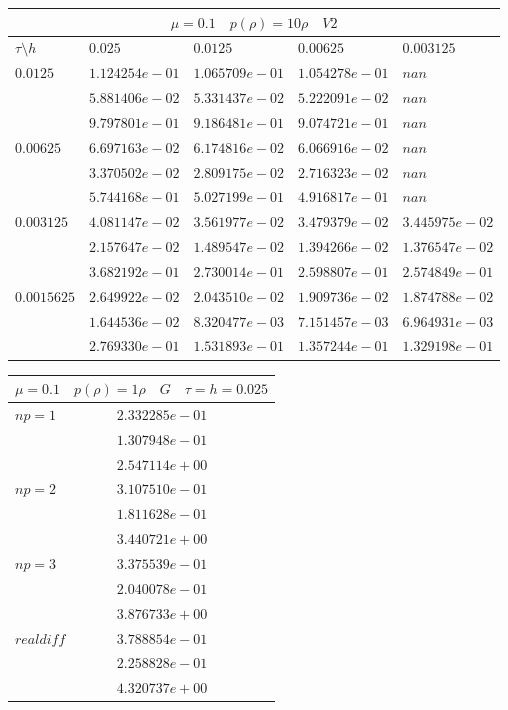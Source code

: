 \documentclass[a4paper,12pt]{extarticle}
\begin{document}
\begin{tabular}{|l|l|l|l|l|}
	\hline
	\multicolumn{5}{|c|}{$\mu =0.1 \quad  p(\rho) =10 \rho \quad V2$}\\
	\hline
	$\tau\setminus h$ & $0.025$ & $0.0125$ & $0.00625$ & $0.003125$\\
	\hline
	$0.0125$  & $1.124254e-01$ & $1.065709e-01$ & $1.054278e-01$ & $nan$\\
	& $5.881406e-02$ & $5.331437e-02$ & $5.222091e-02$ & $nan$\\
	& $9.797801e-01$ & $9.186481e-01$ & $9.074721e-01$ & $nan$\\
	\hline
	$0.00625$  & $6.697163e-02$ & $6.174816e-02$ & $6.066916e-02$ & $nan$\\
	& $3.370502e-02$ & $2.809175e-02$ & $2.716323e-02$ & $nan$\\
	& $5.744168e-01$ & $5.027199e-01$ & $4.916817e-01$ & $nan$\\
	\hline
	$0.003125$  & $4.081147e-02$ & $3.561977e-02$ & $3.479379e-02$ & $3.445975e-02$\\
	& $2.157647e-02$ & $1.489547e-02$ & $1.394266e-02$ & $1.376547e-02$\\
	& $3.682192e-01$ & $2.730014e-01$ & $2.598807e-01$ & $2.574849e-01$\\
	\hline
	$0.0015625$  & $2.649922e-02$ & $2.043510e-02$ & $1.909736e-02$ & $1.874788e-02$\\
	& $1.644536e-02$ & $8.320477e-03$ & $7.151457e-03$ & $6.964931e-03$\\
	& $2.769330e-01$ & $1.531893e-01$ & $1.357244e-01$ & $1.329198e-01$\\
	\hline
\end{tabular}

\begin{tabular}{|l|l|}
	\hline
	\multicolumn{2}{|c|}{$\mu =0.1 \quad  p(\rho) =1 \rho \quad G \quad\tau = h = 0.025$}\\
	\hline
	$ np = 1$  & $2.332285e-01$\\
	& $1.307948e-01$\\
	& $2.547114e+00$\\
	\hline
	$ np = 2$  & $3.107510e-01$\\
	& $1.811628e-01$\\
	& $3.440721e+00$\\
	\hline
	$ np = 3$  & $3.375539e-01$\\
	& $2.040078e-01$\\
	& $3.876733e+00$\\
	\hline
	$ real diff $  & $3.788854e-01$\\
	& $2.258828e-01$\\
	& $4.320737e+00$\\
	\hline
\end{tabular}
\end{document}
